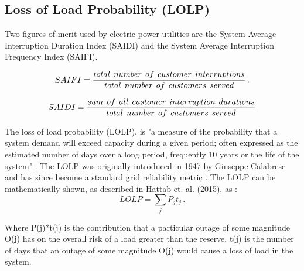 \documentclass[12pt]{UIdahoMastersThesis}
\begin{document}
\subsection{Loss of Load Probability (LOLP)}
Two figures of merit used by electric power utilities are the System Average Interruption Duration Index (SAIDI) and the System Average Interruption Frequency Index (SAIFI).

\begin{equation*}
SAIFI =\frac{total\hspace{.15 cm} number\hspace{.15 cm} of\hspace{.15 cm} customer\hspace{.15 cm} interruptions}{total\hspace{.15 cm} number\hspace{.15 cm} of\hspace{.15 cm} customers\hspace{.15 cm} served}\,.
\end{equation*}

\begin{equation*}
SAIDI = \frac{sum \hspace{.15 cm} of \hspace{.15 cm}all \hspace{.15 cm}customer\hspace{.15 cm}interruption \hspace{.15 cm} durations}{total\hspace{.15 cm}number\hspace{.15 cm}of\hspace{.15 cm}customers\hspace{.15 cm}served}
\end{equation*}

The loss of load probability (LOLP), is "a measure of the probability that a system demand will exceed capacity during a given period; often expressed as the estimated number of days over a long period, frequently 10 years or the life of the system" \cite{Electromn}. The LOLP was originally introduced in 1947 by Giuseppe Calabrese and has since become a standard grid reliability metric \cite{calabrese1947generating}. The LOLP can be mathematically shown, as described in Hattab et. al. (2015), as \cite{Hattab2015}:
\begin{equation*}
LOLP =\sum_{j} P_jt_j\,.
\end{equation*}

Where P(j)*t(j) is the contribution that a particular outage of some magnitude O(j) has on the overall risk of a load greater than the reserve. t(j) is the number of days that an outage of some magnitude O(j) would cause a loss of load in the system\cite{Hattab2015}.
\end{document}
